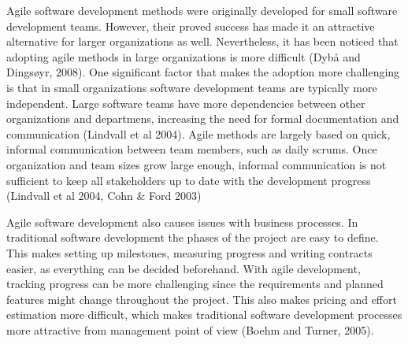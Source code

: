 Agile software development methods were originally developed for small
software development teams. However, their proved success has made it an
attractive alternative for larger organizations as well. Nevertheless,
it has been noticed that adopting agile methods in large organizations
is more difficult (Dybå and Dingsøyr, 2008). One significant factor
that makes the adoption more challenging is that in small organizations
software development teams are typically more independent. Large
software teams have more dependencies between other organizations
and departmens, increasing the need for formal documentation and
communication (Lindvall et al 2004). Agile methods are largely based
on quick, informal communication between team members, such as daily
scrums. Once organization and team sizes grow large enough, informal
communication is not sufficient to keep all stakeholders up to date with
the development progress (Lindvall et al 2004, Cohn \& Ford 2003)

Agile software development also causes issues with business processes.
In traditional software development the phases of the project are easy
to define. This makes setting up milestones, measuring progress and
writing contracts easier, as everything can be decided beforehand. With
agile development, tracking progress can be more challenging since the
requirements and planned features might change throughout the project.
This also makes pricing and effort estimation more difficult, which
makes traditional software development processes more attractive from
management point of view (Boehm and Turner, 2005).
